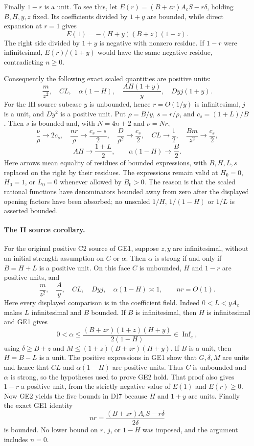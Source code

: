 Finally $1-r$ is a unit. To see this, let
$E(r)=(B+zr)A_cS-r\delta$, holding $B,H,y,z$ fixed.
Its coefficients divided by $1+y$ are bounded, while direct expansion
at $r=1$ gives
\[
 E(1)=-(H+y)(B+z)(1+z).
\]
The right side divided by $1+y$ is negative with nonzero residue.
If $1-r$ were infinitesimal, $E(r)/(1+y)$ would have the same negative
residue, contradicting $n\ge0$.

Consequently the following exact scaled quantities are positive units:
\[
 \frac m{z^2},\quad CL,\quad\alpha(1-H),\quad
 \frac{AH(1+y)}y,\quad Dyj(1+y).
\tag{GE2}
\]
For the IH source subcase $y$ is unbounded, hence $r=O(1/y)$ is
infinitesimal, $j$ is a unit, and $Dy^2$ is a positive unit.
Put $\rho=B/y$, $s=r/\rho$, and $c_s=(1+L)/B$.
Then $s$ is bounded and, with $N=4n+2$ and $\nu=Nr$,
\[
 \frac\nu\rho\longrightarrow2c_s,\quad
 \frac{nr}\rho\longrightarrow\frac{c_s-s}{2},\quad
 \frac D{\rho^2}\longrightarrow\frac{c_s}{2},\quad
 CL\longrightarrow\frac12,\quad
 \frac{Bm}{z^2}\longrightarrow\frac{c_s}{2},
\]
\[
 AH\longrightarrow\frac{1+L}{2},\qquad
 \alpha(1-H)\longrightarrow\frac B2.
\tag{GE3}
\]
Here arrows mean equality of residues of bounded expressions, with
$B,H,L,s$ replaced on the right by their residues. The expressions
remain valid at $H_0=0$, $H_0=1$, or $L_0=0$ whenever allowed by $B_0>0$.
The reason is that the scaled rational functions have denominators
bounded away from zero after the displayed opening factors have
been absorbed; no unscaled $1/H$, $1/(1-H)$ or $1/L$ is asserted bounded.

\label{component:pfb3a83f3849a}
\label{pfb3a83f3849a:sec:common-ii}
\paragraph{The II source corollary.}
\label{sec:ii-source-bounds-refined}
For the original positive C2 source of GE1, suppose $z,y$ are
infinitesimal, without an initial strength assumption on $C$ or $\alpha$. Then $\alpha$ is strong if and only if $B=H+L$
is a positive unit.  On this face $C$ is unbounded, $H$ and
$1-r$ are positive units, and
\[
 \frac{m}{z^2},\quad\frac{A}{y},\quad CL,\quad Dyj,
 \quad\alpha(1-H)\asymp1,\qquad nr=O(1). \tag{DI7}
\]
Here every displayed comparison is in the coefficient field.
Indeed $0<L<yA_c$ makes $L$ infinitesimal and $B$ bounded.
If $B$ is infinitesimal, then $H$ is infinitesimal and GE1 gives
\[
 0<\alpha\le
 \frac{(B+zr)(1+z)(H+y)}{2(1-H)}\in\operatorname{Inf}_c,
\]
using $\delta\ge B+z$ and
$M\le(1+z)(B+zr)(H+y)$.  If $B$ is a unit, then
$H=B-L$ is a unit.  The positive expressions in GE1 show that
$G,\delta,M$ are units and hence that $CL$ and
$\alpha(1-H)$ are positive units.  Thus $C$ is unbounded
and $\alpha$ is strong, so the hypotheses used to prove GE2
hold.  That proof also gives $1-r$ a positive unit, from the
strictly negative value of $E(1)$ and $E(r)\ge0$.
Now GE2 yields the five bounds in DI7 because $H$ and $1+y$
are units.  Finally the exact GE1 identity
\[
 nr=\frac{(B+zr)A_cS-r\delta}{2\delta}
\]
is bounded.  No lower bound on $r$, $j$, or $1-H$ was imposed,
and the argument includes $n=0$.

